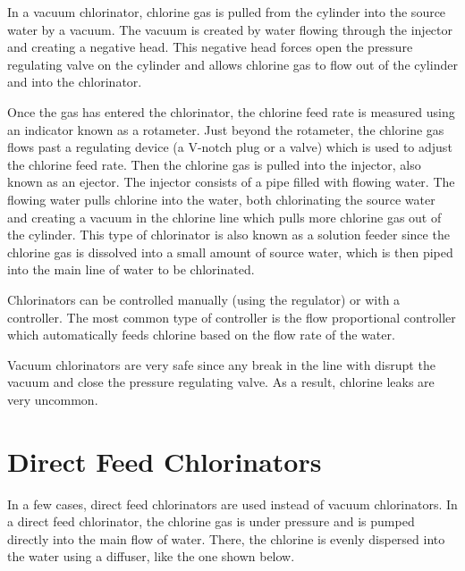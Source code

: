 \documentclass[10pt]{article}
\begin{document}
In a vacuum chlorinator, chlorine gas is pulled from the cylinder into the source water by a vacuum. The vacuum is created by water flowing through the injector and creating a negative head. This negative head forces open the pressure regulating valve on the cylinder and allows chlorine gas to flow out of the cylinder and into the chlorinator.

Once the gas has entered the chlorinator, the chlorine feed rate is measured using an indicator known as a rotameter. Just beyond the rotameter, the chlorine gas flows past a regulating device (a V-notch plug or a valve) which is used to adjust the chlorine feed rate. Then the chlorine gas is pulled into the injector, also known as an ejector. The injector consists of a pipe filled with flowing water. The flowing water pulls chlorine into the water, both chlorinating the source water and creating a vacuum in the chlorine line which pulls more chlorine gas out of the cylinder. This type of chlorinator is also known as a solution feeder since the chlorine gas is dissolved into a small amount of source water, which is then piped into the main line of water to be chlorinated.

Chlorinators can be controlled manually (using the regulator) or with a controller. The most common type of controller is the flow proportional controller which automatically feeds chlorine based on the flow rate of the water.

Vacuum chlorinators are very safe since any break in the line with disrupt the vacuum and close the pressure regulating valve. As a result, chlorine leaks are very uncommon.

\section{Direct Feed Chlorinators}
In a few cases, direct feed chlorinators are used instead of vacuum chlorinators. In a direct feed chlorinator, the chlorine gas is under pressure and is pumped directly into the main flow of water. There, the chlorine is evenly dispersed into the water using a diffuser, like the one shown below.
\end{document}
